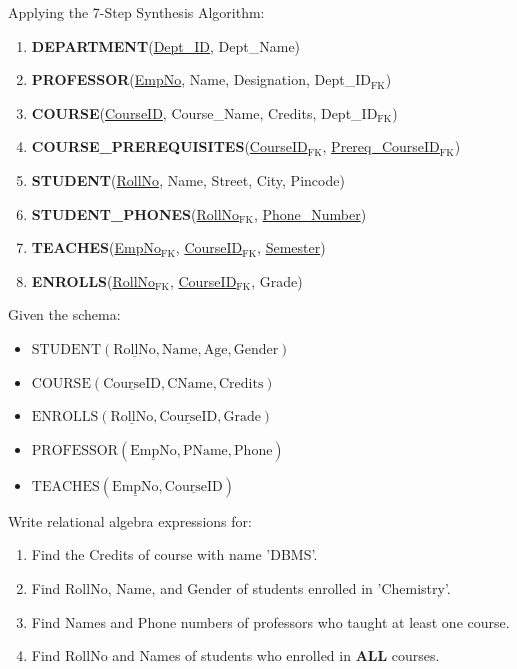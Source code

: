 \documentclass[11pt,a4paper]{article}
\newcommand{\ic}[1]{\mbox{\colorbox{AnthCodeBG}{\footnotesize\ttfamily\textcolor{AnthBlue}{#1}}}}
\newenvironment{Problem}[1][Problem Scenario]{\begin{tcolorbox}[problembox, title=#1]}{\end{tcolorbox}}
\newenvironment{Solution}[1][Step-by-Step Solution]{\begin{tcolorbox}[solbox, title=#1]}{\end{tcolorbox}}
\begin{document}
\begin{Solution}
Applying the 7-Step Synthesis Algorithm:
\begin{enumerate}
  \item \textbf{\ic{DEPARTMENT}}(\underline{Dept\_ID}, Dept\_Name)
  \item \textbf{\ic{PROFESSOR}}(\underline{EmpNo}, Name, Designation, Dept\_ID$_{\text{FK}}$)
  \item \textbf{\ic{COURSE}}(\underline{CourseID}, Course\_Name, Credits, Dept\_ID$_{\text{FK}}$)
  \item \textbf{\ic{COURSE\_PREREQUISITES}}(\underline{CourseID}$_{\text{FK}}$, \underline{Prereq\_CourseID}$_{\text{FK}}$)
  \item \textbf{\ic{STUDENT}}(\underline{RollNo}, Name, Street, City, Pincode)
  \item \textbf{\ic{STUDENT\_PHONES}}(\underline{RollNo}$_{\text{FK}}$, \underline{Phone\_Number})
  \item \textbf{\ic{TEACHES}}(\underline{EmpNo}$_{\text{FK}}$, \underline{CourseID}$_{\text{FK}}$, \underline{Semester})
  \item \textbf{\ic{ENROLLS}}(\underline{RollNo}$_{\text{FK}}$, \underline{CourseID}$_{\text{FK}}$, Grade)
\end{enumerate}
\end{Solution}

\begin{Problem}[Problem 2: Relational Algebra Query Suite on University Schema]
Given the schema:
\begin{itemize}
  \item $\text{STUDENT}(\underline{\text{RollNo}}, \text{Name}, \text{Age}, \text{Gender})$
  \item $\text{COURSE}(\underline{\text{CourseID}}, \text{CName}, \text{Credits})$
  \item $\text{ENROLLS}(\underline{\text{RollNo}}, \underline{\text{CourseID}}, \text{Grade})$
  \item $\text{PROFESSOR}(\underline{\text{EmpNo}}, \text{PName}, \text{Phone})$
  \item $\text{TEACHES}(\underline{\text{EmpNo}}, \underline{\text{CourseID}})$
\end{itemize}
Write relational algebra expressions for:
\begin{enumerate}
  \item Find the Credits of course with name \ic{'DBMS'}.
  \item Find RollNo, Name, and Gender of students enrolled in \ic{'Chemistry'}.
  \item Find Names and Phone numbers of professors who taught at least one course.
  \item Find RollNo and Names of students who enrolled in \textbf{ALL} courses.
\end{enumerate}
\end{Problem}
\end{document}
